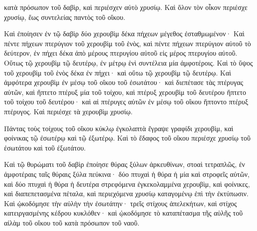{κατὰ πρόσωπον τοῦ δαβὶρ, καὶ περιέσχεν αὐτὸ χρυσίῳ.
Καὶ ὅλον τὸν οἶκον περιέσχε χρυσίῳ, ἕως συντελείας παντὸς τοῦ οἴκου.
\par }{\PP {}Καὶ ἐποίησεν ἐν τῷ δαβὶρ δύο χερουβὶμ δέκα πήχεων μέγεθος ἐσταθμωμένον·
Καὶ πέντε πήχεων πτερύγιον τοῦ χερουβὶμ τοῦ ἑνὸς, καὶ πέντε πήχεων πτερύγιον αὐτοῦ τὸ δεύτερον, ἐν πήχει δέκα ἀπὸ μέρους πτερυγίου αὐτοῦ εἰς μέρος πτερυγίου αὐτοῦ.
Οὕτως τῷ χερουβὶμ τῷ δευτέρῳ, ἐν μέτρῳ ἑνὶ συντέλεια μία ἀμφοτέροις.
Καὶ τὸ ὕψος τοῦ χερουβὶμ τοῦ ἑνὸς δέκα ἐν πήχει· καὶ οὕτω τῷ χερουβὶμ τῷ δευτέρῳ.
Καὶ ἀμφότερα χερουβὶμ ἐν μέσῳ τοῦ οἴκου τοῦ ἐσωτάτου· καὶ διεπέτασε τὰς πτέρυγας αὐτῶν, καὶ ἥπτετο πτέρυξ μία τοῦ τοίχου, καὶ πτέρυξ χερουβὶμ τοῦ δευτέρου ἥπτετο τοῦ τοίχου τοῦ δευτέρου· καὶ αἱ πτέρυγες αὐτῶν ἐν μέσῳ τοῦ οἴκου ἥπτοντο πτέρυξ πτέρυγος.
Καὶ περιέσχε τὰ χερουβὶμ χρυσίῳ.
\par }{\PP {}Πάντας τοὺς τοίχους τοῦ οἴκου κύκλῳ ἐγκολαπτὰ ἔγραψε γραφίδι χερουβὶμ, καὶ φοίνικας τῷ ἐσωτέρῳ καὶ τῷ ἐξωτέρῳ.
Καὶ τὸ ἔδαφος τοῦ οἴκου περιέσχε χρυσίῳ τοῦ ἐσωτάτου καὶ τοῦ ἐξωτάτου.
\par }{\PP {}Καὶ τῷ θυρώματι τοῦ δαβὶρ ἐποίησε θύρας ξύλων ἀρκευθίνων, στοαὶ τετραπλῶς,
ἐν ἀμφοτέραις ταῖς θύραις ξύλα πεύκινα· δύο πτυχαὶ ἡ θύρα ἡ μία καὶ στροφεῖς αὐτῶν, καὶ δύο πτυχαὶ ἡ θύρα ἡ δευτέρα στρεφόμενα ἐγκεκολαμμένα χερουβὶμ,
καὶ φοίνικες, καὶ διαπεπετασμένα πέταλα, καὶ περιεχόμενα χρυσίῳ καταγομένῳ ἐπὶ τὴν ἐκτύπωσιν.
Καὶ ᾠκοδόμησε τὴν αὐλὴν τὴν ἐσωτάτην· τρεῖς στίχους ἀπελεκήτων, καὶ στίχος κατειργασμένης κέδρου κυκλόθεν·
καὶ ᾠκοδόμησε τὸ καταπέτασμα τῆς αὐλῆς τοῦ αἰλὰμ τοῦ οἴκου τοῦ κατὰ πρόσωπον τοῦ ναοῦ.

}
